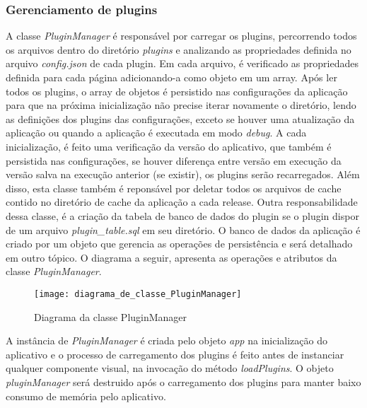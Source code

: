 \subsubsection{Gerenciamento de plugins}\label{sec:solucao-desenvolvida}
A classe \textit{PluginManager} é responsável por carregar os plugins, percorrendo todos os arquivos dentro do diretório \textit{plugins} e analizando as propriedades definida no arquivo \textit{config.json} de cada plugin. Em cada arquivo, é verificado as propriedades definida para cada página adicionando-a como objeto em um array. Após ler todos os plugins, o array de objetos é persistido nas configurações da aplicação para que na próxima inicialização não precise iterar novamente o diretório, lendo as definições dos plugins das configurações, exceto se houver uma atualização da aplicação ou quando a aplicação é executada em modo \textit{debug}. A cada inicialização, é feito uma verificação da versão do aplicativo, que também é persistida nas configurações, se houver diferença entre versão em execução da versão salva na execução anterior (se existir), os plugins serão recarregados. Além disso, esta classe também é reponsável por deletar todos os arquivos de cache contido no diretório de cache da aplicação a cada release. Outra responsabilidade dessa classe, é a criação da tabela de banco de dados do plugin se o plugin dispor de um arquivo \textit{plugin\_table.sql} em seu diretório. O banco de dados da aplicação é criado por um objeto que gerencia as operações de persistência e será detalhado em outro tópico. O diagrama a seguir, apresenta as operações e atributos da classe \textit{PluginManager}.

\begin{figure}[h]
	\texttt{[image: diagrama\_de\_classe\_PluginManager]}
	\centering
	\caption{Diagrama da classe PluginManager}
\end{figure}

A instância de \textit{PluginManager} é criada pelo objeto \textit{app} na inicialização do aplicativo e o processo de carregamento dos plugins é feito antes de instanciar qualquer componente visual, na invocação do método \textit{loadPlugins}. O objeto \textit{pluginManager} será destruido após o carregamento dos plugins para manter baixo consumo de memória pelo aplicativo.


